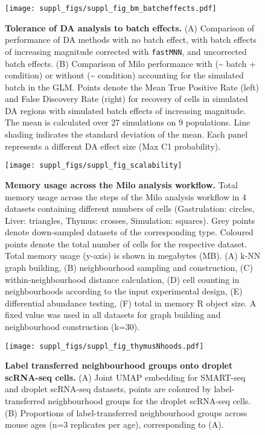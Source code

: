 \documentclass[
]{article}
\begin{document}
\begin{figure}
\centering
\texttt{[image: suppl\_figs/suppl\_fig\_bm\_batcheffects.pdf]}
\caption{\label{fig:sup-fig-bm-batcheffects}\textbf{Tolerance of DA analysis to batch effects.} (A) Comparison of performance of DA methods with no batch effect, with batch effects of increasing magnitude corrected with \texttt{fastMNN}, and uncorrected batch effects. (B) Comparison of Milo performance with (\textasciitilde{} batch + condition) or without (\textasciitilde{} condition) accounting for the simulated batch in the GLM. Points denote the Mean True Positive Rate (left) and False Discovery Rate (right) for recovery of cells in simulated DA regions with simulated batch effects of increasing magnitude. The mean is calculated over 27 simulations on 9 populations. Line shading indicates the standard deviation of the mean. Each panel represents a different DA effect size (Max C1 probability).}
\end{figure}



\begin{figure}[ht]
\texttt{[image: suppl\_figs/suppl\_fig\_scalability]} \caption{\textbf{Memory usage across the Milo analysis workflow.}
Total memory usage across the steps of the Milo analysis workflow in 4 datasets containing different numbers of cells (Gastrulation: circles, Liver: triangles, Thymus: crosses, Simulation: squares). Grey points denote down-sampled datasets of the corresponding type. Coloured points denote the total number of cells for the respective dataset. Total memory usage (y-axis) is shown in megabytes (MB). (A) k-NN graph building, (B) neighbourhood sampling and construction, (C) within-neighbourhood distance calculation, (D) cell counting in neighbourhoods according to the input experimental design, (E) differential abundance testing, (F) total in memory R object size. A fixed value was used in all datasets for graph building and neighbourhood construction (k=30).}\label{fig:sup-fig-scalability}
\end{figure}




\begin{figure}
\centering
\texttt{[image: suppl\_figs/suppl\_fig\_thymusNhoods.pdf]}
\caption{\label{fig:sup-fig-thymus-nhoods}\textbf{Label transferred neighbourhood groups onto droplet scRNA-seq cells.} (A) Joint UMAP embedding for SMART-seq and droplet scRNA-seq datasets, points are coloured by label-transferred neighbourhood groups for the droplet scRNA-seq cells. (B) Proportions of label-transferred neighbourhood groups across mouse ages (n=3 replicates per age), corresponding to (A).}
\end{figure}
\end{document}
